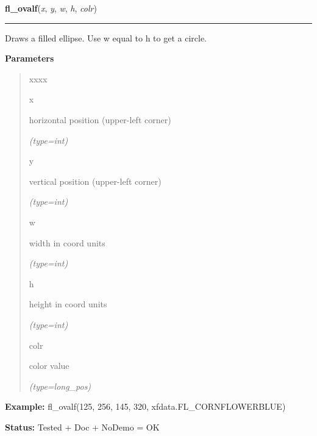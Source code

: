 \hspace{.8\funcindent}\begin{boxedminipage}{\funcwidth}

    \raggedright \textbf{fl\_ovalf}(\textit{x}, \textit{y}, \textit{w}, \textit{h}, \textit{colr})

    \vspace{-1.5ex}

    \rule{\textwidth}{0.5\fboxrule}
\setlength{\parskip}{2ex}
    Draws a filled ellipse. Use w equal to h to get a circle.

\setlength{\parskip}{1ex}
      \textbf{Parameters}
      \vspace{-1ex}

      \begin{quote}
        \begin{Ventry}{xxxx}

          \item[x]

          horizontal position (upper-left corner)

            {\it (type=int)}

          \item[y]

          vertical position (upper-left corner)

            {\it (type=int)}

          \item[w]

          width in coord units

            {\it (type=int)}

          \item[h]

          height in coord units

            {\it (type=int)}

          \item[colr]

          color value

            {\it (type=long\_pos)}

        \end{Ventry}

      \end{quote}

\textbf{Example:} fl\_ovalf(125, 256, 145, 320, xfdata.FL\_CORNFLOWERBLUE)



\textbf{Status:} Tested + Doc + NoDemo = OK



    \end{boxedminipage}

